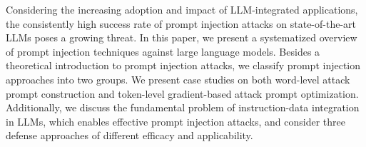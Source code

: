 Considering the increasing adoption and impact of LLM-integrated applications, the consistently high success rate of prompt injection attacks on state-of-the-art LLMs poses a growing threat.
In this paper, we present a systematized overview of prompt injection techniques against large language models.
Besides a theoretical introduction to prompt injection attacks, we classify prompt injection approaches into two groups.
We present case studies on both word-level attack prompt construction and token-level gradient-based attack prompt optimization.
Additionally, we discuss the fundamental problem of instruction-data integration in LLMs, which enables effective prompt injection attacks, and consider three defense approaches of different efficacy and applicability.